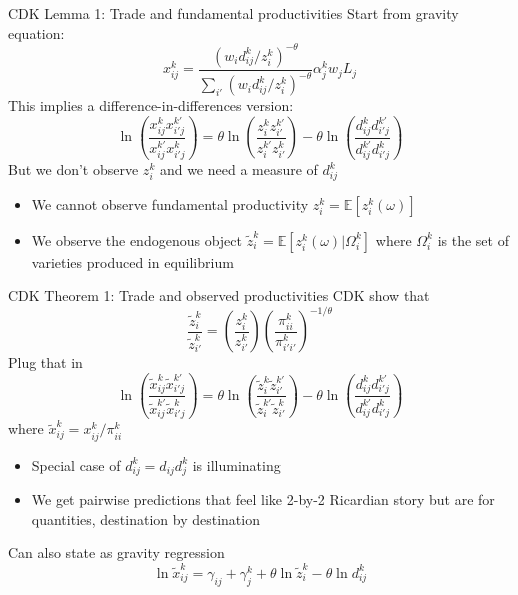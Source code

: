 \documentclass[11pt,notes=hide,aspectratio=169]{beamer}
\begin{document}
\begin{frame}{CDK Lemma 1: Trade and fundamental productivities}
Start from gravity equation:
\begin{equation*}
	x_{ij}^{k}
	= \frac{  \left(w_i d_{ij}^k/z_i^k\right)^{-\theta}}
	{\sum_{i'}\left(w_i d_{ij}^k/z_i^k\right)^{-\theta}} 
	\alpha_j^k w_j L_j
\end{equation*}
This implies a difference-in-differences version:
\begin{equation*}
\ln \left(\frac{x_{ij}^{k}x_{i'j}^{k'}}{x_{ij}^{k'}x_{i'j}^{k}}\right)
=
\theta \ln \left(\frac{z_{i}^{k}z_{i'}^{k'}}{z_{i}^{k'}z_{i'}^{k}}\right)
-
\theta \ln \left(\frac{d_{ij}^{k}d_{i'j}^{k'}}{d_{ij}^{k'}d_{i'j}^{k}}\right)
\end{equation*}
But we don't observe $z_{i}^k$ and we need a measure of $d_{ij}^k$
\begin{itemize}
	\item We cannot observe fundamental productivity
	$z_{i}^k = \mathbb{E}\left[z_i^k(\omega)\right]$
	\item We observe the endogenous object
	$\tilde{z}_{i}^k = \mathbb{E}\left[z_i^k(\omega) \vert \Omega_{i}^k\right]$
	where $\Omega_{i}^k$ is the set of varieties produced in equilibrium
\end{itemize}
\end{frame}
\begin{frame}{CDK Theorem 1: Trade and observed productivities}
CDK show that
\begin{equation*}
\frac{\tilde{z}_i^k}{\tilde{z}_{i'}^k} = \left(\frac{z_i^k}{z_{i'}^k}\right)  \left(\frac{\pi_{ii}^k}{\pi_{i'i'}^k}\right)^{-1/\theta}
\end{equation*}
Plug that in
\begin{equation*}
\ln \left(\frac{\tilde{x}_{ij}^{k}\tilde{x}_{i'j}^{k'}}{\tilde{x}_{ij}^{k'}\tilde{x}_{i'j}^{k}}\right)
=
\theta \ln \left(\frac{\tilde{z}_{i}^{k}\tilde{z}_{i'}^{k'}}{\tilde{z}_{i}^{k'}\tilde{z}_{i'}^{k}}\right)
-
\theta \ln \left(\frac{d_{ij}^{k}d_{i'j}^{k'}}{d_{ij}^{k'}d_{i'j}^{k}}\right)
\end{equation*}
where $\tilde{x}_{ij}^{k} = {x}_{ij}^{k} / \pi_{ii}^k$
\begin{itemize}
	\item Special case of $d_{ij}^{k} = d_{ij} d_j^k$ is illuminating
	\item We get pairwise predictions that feel like 2-by-2 Ricardian story but are for quantities, destination by destination
\end{itemize}
Can also state as gravity regression
\begin{equation*}
\ln \tilde{x}_{ij}^{k} = \gamma_{ij} + \gamma_j^k + \theta \ln \tilde{z}_{i}^{k} - \theta \ln d_{ij}^k
\end{equation*}
\end{frame}
\end{document}
